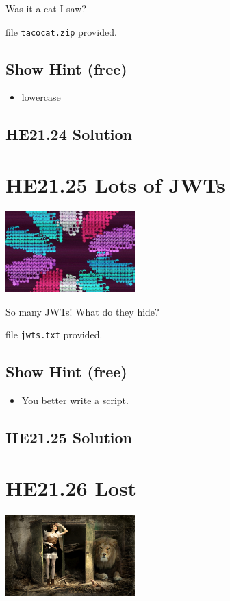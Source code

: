\documentclass[english,a4paper,nols,noindent]{tufte-handout}
\begin{document}
\noindent Was it a cat I saw?

file \verb+tacocat.zip+ provided.

\subsection{Show Hint (free)}
\begin{itemize}
\item lowercase
\end{itemize}

\hypertarget{he21.24-solution}{%
\subsection{HE21.24 Solution}\label{he21.24-solution}}

\noindent 


\hypertarget{he21.25}{%
  \section{HE21.25 Lots of JWTs}
  \label{he21.25}}
\begin{marginfigure}
    \includegraphics[width=50mm]{images/challenge25.jpg}
\end{marginfigure}

\noindent So many JWTs! What do they hide?

file \verb+jwts.txt+ provided.

\subsection{Show Hint (free)}
\begin{itemize}
\item You better write a script.
\end{itemize}

\hypertarget{he21.25-solution}{%
\subsection{HE21.25 Solution}\label{he21.25-solution}}

\noindent 


\hypertarget{he21.26}{%
  \section{HE21.26 Lost}
  \label{he21.26}}
\begin{marginfigure}
    \includegraphics[width=50mm]{images/challenge26.jpg}
\end{marginfigure}
\end{document}
